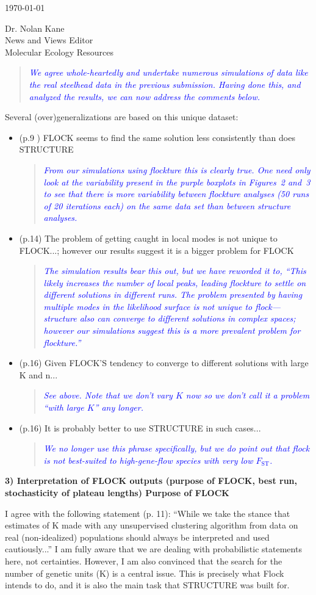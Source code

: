 \documentclass[11pt]{letter}
\newcommand{\reply}[1]{\begin{quotation}\small\sl\textcolor{blue}{#1}\end{quotation}}
\begin{document}
\begin{letter}{ \today 

Dr. Nolan Kane\\
News and Views Editor\\
Molecular Ecology Resources \\
}
\reply{We agree whole-heartedly and undertake numerous simulations of data like the real
steelhead data in the previous submission.  Having done this, and analyzed the results,
we can now address the comments below.}
Several (over)generalizations are based on this unique dataset:
\begin{itemize}
\item (p.9 ) FLOCK seems to find the same solution less consistently than does STRUCTURE
\reply{From our simulations using {\sc flockture} this is clearly true.  One need only look
at the variability present in the purple boxplots in Figures~2 and~3 to see that there is more
variability between {\sc flockture} analyses (50 runs of 20 iterations each) on the same data set 
than between {\sc structure} analyses. }
\item (p.14) The problem of getting caught in local modes is not unique to FLOCK...; however our results suggest it is a bigger problem for FLOCK
\reply{The simulation results bear this out, but we have reworded it to, ``This likely 
increases the number of
local peaks, leading {\sc flockture} to settle on different solutions in 
different runs. The problem presented by having multiple modes in the likelihood surface 
is not unique to {\sc flock}---{\sc structure} also can converge to 
different solutions in complex spaces; however our simulations suggest this is a more  
prevalent problem for {\sc flockture}.''
}
\item (p.16) Given FLOCK'S tendency to converge to different solutions with large K and n...
\reply{See above.  Note that we don't vary $K$ now so we don't call it a problem ``with large $K$'' any
longer.}
\item (p.16) It is probably better to use STRUCTURE in such cases...
\reply{We no longer use this phrase specifically, but we do point out that {\sc flock} is not best-suited to high-gene-flow
species with very low $F_\mathrm{ST}$.}
\end{itemize}

{\bf 3) Interpretation of FLOCK outputs (purpose of FLOCK, best run, stochasticity of plateau lengths)
Purpose of FLOCK}

I agree with the following statement (p. 11):
``While we take the stance that estimates of K made with any unsupervised clustering algorithm from data on real (non-idealized) populations should always be interpreted and used cautiously...''
I am fully aware that we are dealing with probabilistic statements here, not certainties. However, I am also convinced that the search for the number of genetic units (K) is a central issue. This is precisely what Flock intends to do, and it is also the main task that STRUCTURE was built for.


\end{letter}
\end{document}
